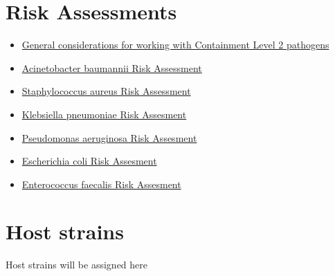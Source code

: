 \documentclass[
]{book}
\providecommand{\tightlist}{%
  \setlength{\itemsep}{0pt}\setlength{\parskip}{0pt}}
\begin{document}
\hypertarget{risk-assessment}{%
\chapter{Risk Assessments}\label{risk-assessment}}

\begin{itemize}
\tightlist
\item
  \href{RA/CL2-RA.pdf}{General considerations for working with Containment Level 2 pathogens}
\item
  \href{RA/Acinetobacter-RA.pdf}{Acinetobacter baumannii Risk Assessment}
\item
  \href{RA/Staphylococcus-RA.pdf}{Staphylococcus aureus Risk Assessment}
\item
  \href{RA/Klebisella-RA.pdf}{Klebsiella pneumoniae Risk Assesment}
\item
  \href{RA/Pseudomonas-RA.pdf}{Pseudomonas aeruginosa Risk Assesment}
\item
  \href{RA/EC-RA.pdf}{Escherichia coli Risk Assesment}
\item
  \href{RA/EF-RA.pdf}{Enterococcus faecalis Risk Assesment}
\end{itemize}

\hypertarget{host-strains}{%
\chapter*{Host strains}\label{host-strains}}

Host strains will be assigned here

  
\end{document}
